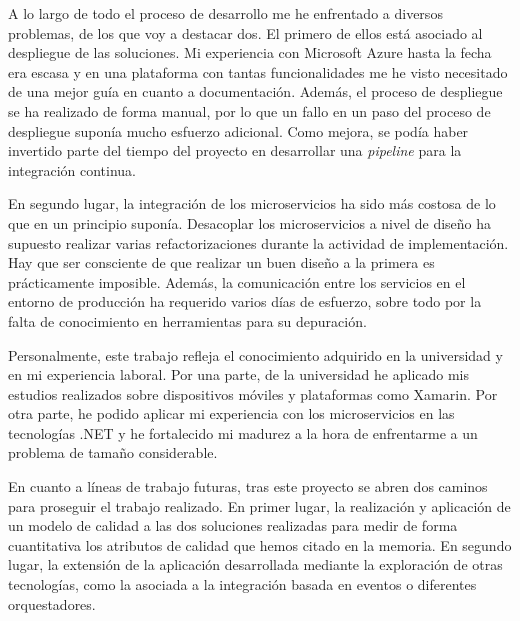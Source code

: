 \documentclass[11pt,spanish,listoffigures]{tfgetsinf}
\begin{document}
A lo largo de todo el proceso de desarrollo me he enfrentado a diversos problemas, de los que voy a destacar dos. El primero de ellos está asociado al despliegue de las soluciones. Mi experiencia con Microsoft Azure hasta la fecha era escasa y en una plataforma con tantas funcionalidades me he visto necesitado de una mejor guía en cuanto a documentación. Además, el proceso de despliegue se ha realizado de forma manual, por lo que un fallo en un paso del proceso de despliegue suponía mucho esfuerzo adicional. Como mejora, se podía haber invertido parte del tiempo del proyecto en desarrollar una \textit{pipeline} para la integración continua.

En segundo lugar, la integración de los microservicios ha sido más costosa de lo que en un principio suponía. Desacoplar los microservicios a nivel de diseño ha supuesto realizar varias refactorizaciones durante la actividad de implementación. Hay que ser consciente de que realizar un buen diseño a la primera es prácticamente imposible. Además, la comunicación entre los servicios en el entorno de producción ha requerido varios días de esfuerzo, sobre todo por la falta de conocimiento en herramientas para su depuración.

Personalmente, este trabajo refleja el conocimiento adquirido en la universidad y en mi experiencia laboral. Por una parte, de la universidad he aplicado mis estudios realizados sobre dispositivos móviles y plataformas como Xamarin. Por otra parte, he podido aplicar mi experiencia con los microservicios en las tecnologías .NET y he fortalecido mi madurez a la hora de enfrentarme a un problema de tamaño considerable.

En cuanto a líneas de trabajo futuras, tras este proyecto se abren dos caminos para proseguir el trabajo realizado. En primer lugar, la realización y aplicación de un modelo de calidad a las dos soluciones realizadas para medir de forma cuantitativa los atributos de calidad que hemos citado en la memoria. En segundo lugar, la extensión de la aplicación desarrollada mediante la exploración de otras tecnologías, como la asociada a la integración basada en eventos o diferentes orquestadores.


\renewcommand{\bibname}{Referencias}
\end{document}
